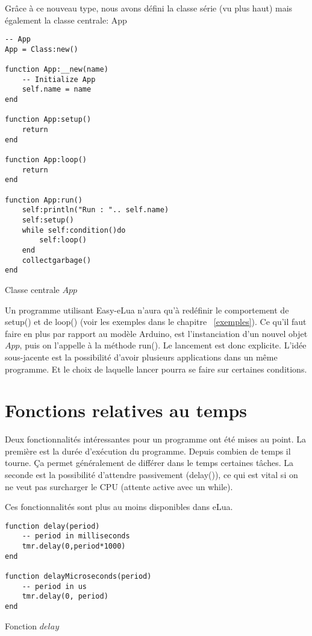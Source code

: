 \newpage

Grâce à ce nouveau type, nous avons défini la classe série (vu plus haut) mais également la classe centrale: App

\begin{table}[h]
\begin{lstlisting}
-- App
App = Class:new()

function App:__new(name)
    -- Initialize App
    self.name = name
end

function App:setup()
    return
end

function App:loop()
    return
end

function App:run()
    self:println("Run : ".. self.name)
    self:setup()
    while self:condition()do
        self:loop()
    end
    collectgarbage()
end
\end{lstlisting}
\caption{Classe centrale $App$}
\end{table}

Un programme utilisant Easy-eLua n’aura qu'à redéfinir le comportement de setup() et de loop() (voir les exemples dans le chapitre ~\ref{exemples}). 
Ce qu'il faut faire en plus par rapport au modèle Arduino, est l’instanciation d’un nouvel objet $App$, puis on l'appelle à la méthode run(). 
Le lancement est donc explicite. L’idée sous-jacente est la possibilité d’avoir plusieurs applications dans un même programme.
Et le choix de laquelle lancer pourra se faire sur certaines conditions. 

\section{Fonctions relatives au temps}

Deux fonctionnalités intéressantes pour un programme ont été mises au point. 
La première est la durée d’exécution du programme. Depuis combien de temps il tourne. Ça permet généralement de différer dans le temps 
certaines tâches. La seconde est la possibilité d'attendre passivement (delay()), ce qui est vital si on ne veut pas surcharger le CPU 
(attente active avec un while).

Ces fonctionnalités sont plus au moins disponibles dans eLua.
\newpage
\begin{table}[h]
\begin{lstlisting}
function delay(period)
    -- period in milliseconds
    tmr.delay(0,period*1000)
end

function delayMicroseconds(period)
    -- period in us
    tmr.delay(0, period)
end
\end{lstlisting}
\caption{Fonction $delay$}
\end{table}

